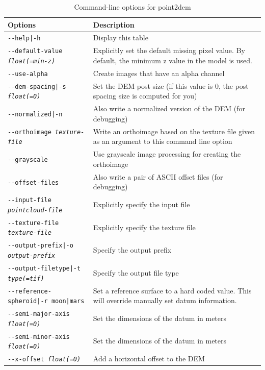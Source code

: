 \begin{longtable}{|l|p{10cm}|}
\caption{Command-line options for point2dem}
\label{tbl:point2dem}
\endfirsthead
\endhead
\endfoot
\endlastfoot
\hline
Options & Description \\ \hline \hline
\texttt{-\/-help|-h} & Display this table \\ \hline
\texttt{-\/-default-value \textit{float(=min-z)}} & Explicitly set the default missing pixel value. By default, the minimum z value in the model is used. \\ \hline
\texttt{-\/-use-alpha} & Create images that have an alpha channel \\ \hline
\texttt{-\/-dem-spacing|-s \textit{float(=0)}} & Set the \ac{DEM} post size (if this value is 0, the post spacing size is computed for you) \\ \hline
\texttt{-\/-normalized|-n} & Also write a normalized version of the \ac{DEM} (for debugging) \\ \hline
\texttt{-\/-orthoimage \textit{texture-file}} & Write an orthoimage based on the texture file given as an argument to this command line option \\ \hline
\texttt{-\/-grayscale} & Use grayscale image processing for creating the orthoimage \\ \hline
\texttt{-\/-offset-files} & Also write a pair of ASCII offset files (for debugging) \\ \hline
\texttt{-\/-input-file \textit{pointcloud-file}} & Explicitly specify the input file \\ \hline
\texttt{-\/-texture-file \textit{texture-file}} & Explicitly specify the texture file \\ \hline
\texttt{-\/-output-prefix|-o \textit{output-prefix}} & Specify the output prefix \\ \hline
\texttt{-\/-output-filetype|-t \textit{type(=tif)}} & Specify the output file type \\ \hline
\texttt{-\/-reference-spheroid|-r moon|mars} & Set a reference surface to a hard coded value. This will override manually set datum information. \\ \hline
\texttt{-\/-semi-major-axis \textit{float(=0)}} & Set the dimensions of the datum in meters\\ \hline
\texttt{-\/-semi-minor-axis \textit{float(=0)}} & Set the dimensions of the datum in meters\\ \hline
\texttt{-\/-x-offset \textit{float(=0)}} & Add a horizontal offset to the \ac{DEM} \\ \hline

\end{longtable}
